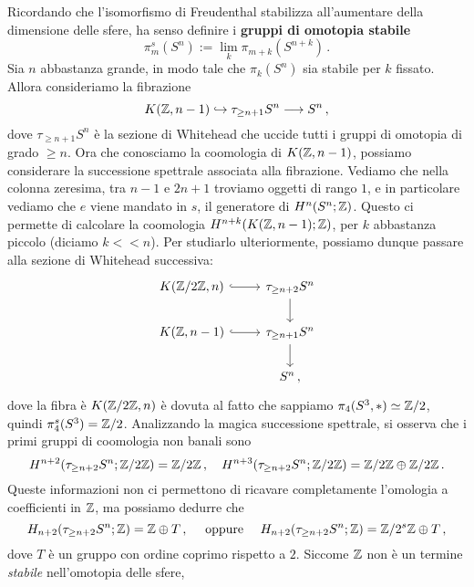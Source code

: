 Ricordando che l'isomorfismo di Freudenthal stabilizza all'aumentare della
dimensione delle sfere, ha senso definire i \textbf{gruppi di omotopia stabile}
\begin{equation*}
	\pi_{m}^{s}(S^{n}) := \lim_{k} \pi_{m+k}(S^{n+k})\,.
\end{equation*}
Sia $n$ abbastanza grande, in modo tale che $\pi_{k}(S^{n})$ sia stabile per $k$ fissato.
Allora consideriamo la fibrazione
\begin{equation*}
	K({\mathbb Z},n-1) \hookrightarrow \tau_{\ge n+1} S^{n} \longrightarrow S^{n}\,,
\end{equation*}
dove $\tau_{\ge n+1} S^{n}$ è la sezione di Whitehead che uccide tutti i gruppi
di omotopia di grado $ \ge n$. Ora che conosciamo la coomologia di $K({\mathbb Z},n-1)$,
possiamo considerare la successione spettrale associata alla fibrazione.
Vediamo che nella colonna zeresima, tra $n-1$ e $2n+1$ troviamo oggetti
di rango $1$, e in particolare vediamo che $e$ viene mandato in $s$, 
il generatore di $H^{n}(S^{n};{\mathbb Z})$. Questo ci permette di calcolare la
coomologia $H^{n+k}(K({\mathbb Z},n-1);{\mathbb Z})$, per $k$ abbastanza piccolo (diciamo $k << n$).
Per studiarlo ulteriormente, possiamo dunque passare
alla sezione di Whitehead successiva:
\begin{equation*}
	\begin{tikzcd}
		K(\Z/2\Z,n) \ar[r, hook] & \tau_{\ge n+2} S^{n} \ar[d] \\
		K(\Z,n-1) \ar[r, hook] & \tau_{\ge n+1} S^{n} \ar[d] \\
		& S^{n}\,,
	\end{tikzcd}
\end{equation*}
dove la fibra è $K({\mathbb Z}/2{\mathbb Z},n)$ è dovuta al fatto che sappiamo $\pi_{4}(S^{3}, \ast) \simeq {\mathbb Z}/2$,
quindi $\pi_{4}^{s}(S^{3}) = {\mathbb Z}/2$.
Analizzando la magica successione spettrale,
si osserva che i primi gruppi di coomologia non banali sono
\begin{equation*}
	H^{n+2}(\tau_{\ge n+2}S^{n}; {\mathbb Z}/2{\mathbb Z}) = {\mathbb Z}/2{\mathbb Z}\,, 
	\quad H^{n+3}(\tau_{\ge n+2}S^{n}; {\mathbb Z}/2{\mathbb Z}) = {\mathbb Z}/2{\mathbb Z} \oplus {\mathbb Z}/2{\mathbb Z}\,.
\end{equation*}
Queste informazioni non ci permettono di ricavare completamente l'omologia
a coefficienti in ${\mathbb Z}$, ma possiamo dedurre che
\begin{equation*}
	H_{n+2}(\tau_{\ge n+2}S^{n}; {\mathbb Z}) = {\mathbb Z} \oplus T\,, \quad
	\text{ oppure } \quad 
	H_{n+2}(\tau_{\ge n+2}S^{n}; {\mathbb Z}) = {\mathbb Z}/2^{s}{\mathbb Z} \oplus T\,,
\end{equation*}
dove $T$ è un gruppo con ordine coprimo rispetto a $2$.
Siccome ${\mathbb Z}$ non è un termine \emph{stabile} nell'omotopia delle sfere,

